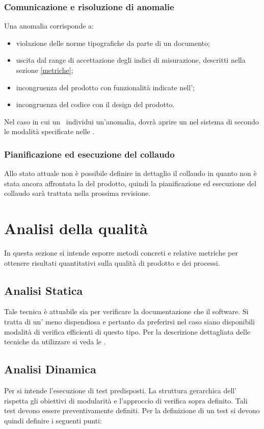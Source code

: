 \documentclass[12pt,a4paper]{article}
\begin{document}
\subsubsection{Comunicazione e risoluzione di anomalie}
Una anomalia corrisponde a:

\begin{itemize}
	\item violazione delle norme tipografiche da parte di un documento;
	\item uscita dal range di accettazione degli indici di misurazione, descritti nella sezione \ref{metriche};
	\item incongruenza del prodotto con funzionalità indicate nell'\AdR;
	\item incongruenza del codice con il design del prodotto.
\end{itemize}

Nel caso in cui un \VR\ individui un'anomalia, dovrà aprire un  nel sistema di  secondo le modalità specificate nelle \NdP.

\subsubsection{Pianificazione ed esecuzione del collaudo}
Allo stato attuale non è possibile definire in dettaglio il collaudo in quanto non è stata ancora affrontata la  del prodotto, quindi la pianificazione ed esecuzione del collaudo sarà trattata nella prossima revisione.

\newpage

\section{Analisi della qualità}\label{analisi}
In questa sezione si intende esporre metodi concreti e relative metriche per ottenere risultati quantitativi sulla qualità di prodotto e dei processi. 

\subsection{Analisi Statica} 
Tale tecnica è attuabile sia per verificare la documentazione che il software. Si tratta di un' meno dispendiosa e pertanto da preferirsi nel caso siano disponibili modalità di verifica efficienti di questo tipo. Per la descrizione dettagliata delle tecniche da utilizzare si veda le \NdP.

\subsection{Analisi Dinamica} 
Per  si intende l'esecuzione di test predisposti. La struttura gerarchica dell' rispetta gli obiettivi di modularità e l'approccio di verifica  sopra definito. Tali test devono essere preventivamente definiti. Per la definizione di un test si devono quindi definire i seguenti punti:
\end{document}
